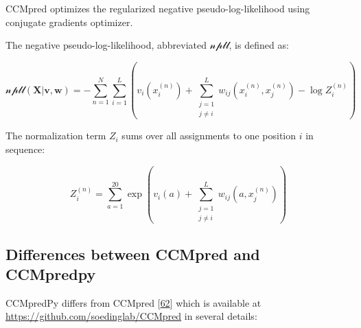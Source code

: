 \documentclass[12pt,a4paper,twoside]{book}
\renewcommand{\v}{\mathbf{v}}
\newcommand{\w}{\mathbf{w}}
\theoremstyle{definition}
\theoremstyle{definition}
\theoremstyle{remark}
\begin{document}
CCMpred optimizes the regularized negative pseudo-log-likelihood using
conjugate gradients optimizer.

The negative pseudo-log-likelihood, abbreviated \(\mathcal{npll}\), is
defined as:

\begin{equation}
  \mathcal{npll}(\mathbf{X} | \v,\w) =   - \sum_{n=1}^N \sum_{i=1}^L  \left(  v_i(x_i^{(n)}) + \sum_{\substack{j=1 \\ j \neq i}}^L w_{ij}(x_i^{(n)}, x_j^{(n)})  - \log Z_i^{(n)} \right)
\end{equation}

The normalization term \(Z_i\) sums over all assignments to one position
\(i\) in sequence:

\begin{equation}
  Z_i^{(n)} = \sum_{a=1}^{20} \exp \left( v_i(a) + \sum_{\substack{j=1 \\ j \neq i}}^L w_{ij}(a, x_j^{(n)}) \right)
\end{equation}

\subsection{Differences between CCMpred and
CCMpredpy}\label{diff-ccmpred-ccmpredpy}

CCMpredPy differs from CCMpred
{[}\protect\hyperlink{ref-Seemayer2014}{62}{]} which is available at
\url{https://github.com/soedinglab/CCMpred} in several details:
\end{document}
